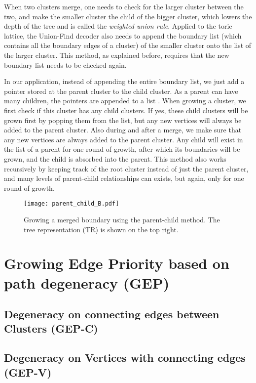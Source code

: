 When two clusters merge, one needs to check for the larger cluster between the two, and make the smaller cluster the child of the bigger cluster, which lowers the depth of the tree and is called the \emph{weighted union rule}. Applied to the toric lattice, the Union-Find decoder also needs to append the boundary list (which contains all the boundary edges of a cluster) of the smaller cluster onto the list of the larger cluster. This method, as explained before, requires that the new boundary list needs to be checked again.

In our application, instead of appending the entire boundary list, we just add a pointer stored at the parent cluster to the child cluster. As a parent can have many children, the pointers are appended to a list . When growing a cluster, we first check if this cluster has any child clusters. If yes, these child clusters will be grown first by popping them from the list, but any new vertices will always be added to the parent cluster. Also during and after a merge, we make sure that any new vertices are always added to the parent cluster. Any child will exist in the list of a parent for one round of growth, after which its boundaries will be grown, and the child is absorbed into the parent. This method also works recursively by keeping track of the root cluster instead of just the parent cluster, and many levels of parent-child relationships can exists, but again, only for one round of growth.

\begin{figure}
  \centering
  \texttt{[image: parent\_child\_B.pdf]}
  \caption{Growing a merged boundary using the parent-child method. The tree representation (TR) is shown on the top right. }\label{3.fig.parentchildB}
\end{figure}


\section{Growing Edge Priority based on path degeneracy (GEP)}
\subsection{Degeneracy on connecting edges between Clusters (GEP-C)}
\subsection{Degeneracy on Vertices with connecting edges (GEP-V)}

